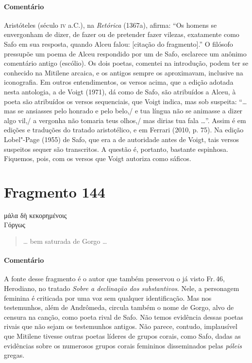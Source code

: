 {\paragraph{Comentário} Aristóteles (século \textsc{iv} a.C.), na \textit{Retórica} (1367a), afirma: ``Os homens se envergonham de dizer, de fazer ou de pretender fazer vilezas, exatamente
como Safo em sua resposta, quando Alceu falou: [citação do fragmento].''
O filósofo pressupõe um poema de Alceu respondido por um de Safo, esclarece um anônimo comentário antigo (escólio). Os
dois poetas, comentei na introdução, podem ter se conhecido na Mitilene arcaica, e
os antigos sempre os aproximavam, inclusive na iconografia.
Em outros entendimentos, os versos acima, que a edição adotada nesta antologia, a de Voigt (1971), dá como de Safo, são atribuídos a Alceu, à poeta são atribuídos os versos sequenciais, que Voigt indica, mas sob suspeita: ``\ldots{} mas se ansiasses pelo honrado e pelo belo,/ e tua língua não se animasse a dizer algo vil,/ a vergonha não tomaria teus olhos,/ mas dirias tua fala \ldots{}''. Assim é em edições e traduções do tratado aristotélico, e em Ferrari (2010, p. 75). Na edição Lobel"-Page (1955) de Safo, que era a de autoridade antes de Voigt, tais versos suspeitos sequer são transcritos. A questão é, portanto, bastante espinhosa. Fiquemos, pois, com os versos que Voigt autoriza como sáficos.}

\pagebreak
\section{Fragmento 144}

\begin{gkverse}
μάλα δὴ κεκορημένοις\\
Γόργως
\end{gkverse}

\begin{verse}
\ldots{} bem saturada de Gorgo \ldots{}
\end{verse}

{\paragraph{Comentário} A fonte desse fragmento é o autor que também preservou o já visto Fr.\,46, Herodiano, no tratado
\textit{Sobre a declinação dos substantivos}. Nele, a personagem feminina é
criticada por uma voz sem qualquer identificação. Mas nos testemunhos, além de Andrômeda, circula também o nome de Gorgo, alvo de censura na canção, como poeta rival de Safo. Não temos evidência dessas poetas rivais que não sejam os testemunhos antigos. Não parece, contudo, implausível que Mitilene tivesse outras poetas líderes de grupos corais, como Safo, dadas as evidências sobre os numerosos  grupos corais femininos disseminados pelas \textit{póleis} gregas.}

